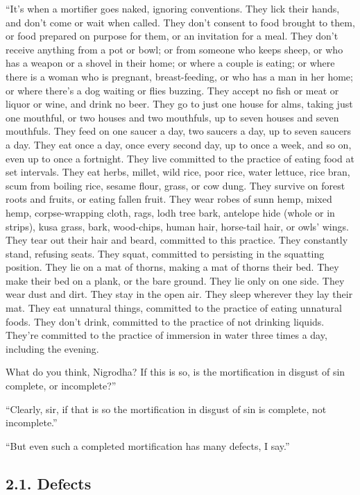 \documentclass[12pt,openany]{book}%
\begin{document}
“It’s when a mortifier goes naked, ignoring conventions. They lick their hands, and don’t come or wait when called. They don’t consent to food brought to them, or food prepared on purpose for them, or an invitation for a meal. They don’t receive anything from a pot or bowl; or from someone who keeps sheep, or who has a weapon or a shovel in their home; or where a couple is eating; or where there is a woman who is pregnant, breast-feeding, or who has a man in her home; or where there’s a dog waiting or flies buzzing. They accept no fish or meat or liquor or wine, and drink no beer. They go to just one house for alms, taking just one mouthful, or two houses and two mouthfuls, up to seven houses and seven mouthfuls. They feed on one saucer a day, two saucers a day, up to seven saucers a day. They eat once a day, once every second day, up to once a week, and so on, even up to once a fortnight. They live committed to the practice of eating food at set intervals. They eat herbs, millet, wild rice, poor rice, water lettuce, rice bran, scum from boiling rice, sesame flour, grass, or cow dung. They survive on forest roots and fruits, or eating fallen fruit. They wear robes of sunn hemp, mixed hemp, corpse-wrapping cloth, rags, lodh tree bark, antelope hide (whole or in strips), kusa grass, bark, wood-chips, human hair, horse-tail hair, or owls’ wings. They tear out their hair and beard, committed to this practice. They constantly stand, refusing seats. They squat, committed to persisting in the squatting position. They lie on a mat of thorns, making a mat of thorns their bed. They make their bed on a plank, or the bare ground. They lie only on one side. They wear dust and dirt. They stay in the open air. They sleep wherever they lay their mat. They eat unnatural things, committed to the practice of eating unnatural foods. They don’t drink, committed to the practice of not drinking liquids. They’re committed to the practice of immersion in water three times a day, including the evening. 

What do you think, Nigrodha? If this is so, is the mortification in disgust of sin complete, or incomplete?” 

“Clearly, sir, if that is so the mortification in disgust of sin is complete, not incomplete.” 

“But even such a completed mortification has many defects, I say.” 

\subsection*{2.1. Defects }
\end{document}
